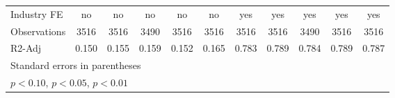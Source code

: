 \begin{table}[htbp]
\begin{tabular}{l*{10}{c}}
Industry FE     &       no         &       no         &       no         &       no         &       no         &      yes         &      yes         &      yes         &      yes         &      yes         \\
Observations    &     3516         &     3516         &     3490         &     3516         &     3516         &     3516         &     3516         &     3490         &     3516         &     3516         \\
R2-Adj          &    0.150         &    0.155         &    0.159         &    0.152         &    0.165         &    0.783         &    0.789         &    0.784         &    0.789         &    0.787         \\
\hline\hline
\multicolumn{11}{l}{\footnotesize Standard errors in parentheses}\\
\multicolumn{11}{l}{\footnotesize \sym{*} \(p<0.10\), \sym{**} \(p<0.05\), \sym{***} \(p<0.01\)}\\
\end{tabular}
\end{table}

